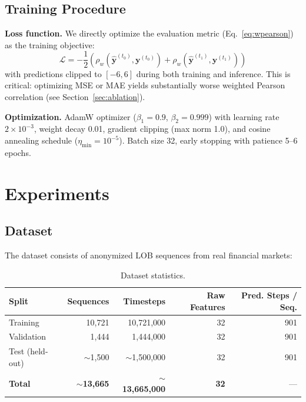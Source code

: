 \documentclass[11pt,a4paper]{article}
\newcommand{\wpearson}{\rho_w}
\newcommand{\by}{\mathbf{y}}
\begin{document}
\subsection{Training Procedure}
\label{sec:training}

\textbf{Loss function.} We directly optimize the evaluation metric (Eq.~\ref{eq:wpearson}) as the training objective:
\begin{equation}
    \mathcal{L} = -\frac{1}{2}\left(\wpearson(\hat{\by}^{(t_0)}, \by^{(t_0)}) + \wpearson(\hat{\by}^{(t_1)}, \by^{(t_1)})\right)
    \label{eq:loss}
\end{equation}
with predictions clipped to $[-6, 6]$ during both training and inference. This is critical: optimizing MSE or MAE yields substantially worse weighted Pearson correlation (see Section~\ref{sec:ablation}).

\textbf{Optimization.} AdamW optimizer ($\beta_1{=}0.9$, $\beta_2{=}0.999$) with learning rate $2 \times 10^{-3}$, weight decay 0.01, gradient clipping (max norm 1.0), and cosine annealing schedule ($\eta_{\min} = 10^{-5}$). Batch size 32, early stopping with patience 5--6 epochs.


\section{Experiments}
\label{sec:experiments}

\subsection{Dataset}

The dataset consists of anonymized LOB sequences from real financial markets:

\begin{table}[h]
\centering
\small
\caption{Dataset statistics.}
\label{tab:dataset}
\begin{tabular}{@{}lrrrr@{}}
\toprule
\textbf{Split} & \textbf{Sequences} & \textbf{Timesteps} & \textbf{Raw Features} & \textbf{Pred. Steps / Seq.} \\
\midrule
Training & 10{,}721 & 10{,}721{,}000 & 32 & 901 \\
Validation & 1{,}444 & 1{,}444{,}000 & 32 & 901 \\
Test (held-out) & $\sim$1{,}500 & $\sim$1{,}500{,}000 & 32 & 901 \\
\midrule
\textbf{Total} & $\sim$\textbf{13{,}665} & $\sim$\textbf{13{,}665{,}000} & \textbf{32} & --- \\
\bottomrule
\end{tabular}
\end{table}
\end{document}
